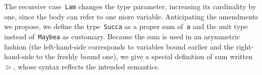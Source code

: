 \documentclass[9pt,preprint,authoryear]{sigplanconf}
\begin{document}
%
The recursive case{~}\textcolor[rgb]{0.70,0.13,0.13}{\texttt{Lam}} changes the type parameter, increasing
    its cardinality by one, since the body can refer to one more
    variable. Anticipating the amendments we propose, we define the
    type{~}\textcolor[rgb]{0,0,0.80}{\texttt{Succ}}\textcolor[rgb]{0,0,0.80}{\texttt{\mbox{\hspace{0.50em}}}}\textcolor[rgb]{0,0,0.80}{\texttt{a}} as a proper sum of{~}\textcolor[rgb]{0,0,0.80}{\texttt{a}} and the unit type{~}\textcolor[cmyk]{0,0.65,0.99,0}{\texttt{\makebox[1.22ex][l]{$ {(} $}}}\textcolor[cmyk]{0,0.65,0.99,0}{\texttt{\makebox[1.22ex][r]{$ {)} $}}}    instead of{~}\textcolor[rgb]{0,0,0.80}{\texttt{Maybe}}\textcolor[rgb]{0,0,0.80}{\texttt{\mbox{\hspace{0.50em}}}}\textcolor[rgb]{0,0,0.80}{\texttt{a}} as customary. Because the sum is used in an
    asymmetric fashion (the left-hand-side corresponds to variables
    bound earlier and the right-hand-side to the freshly bound one),
    we give a special definition of sum written{~}\textcolor[rgb]{0,0,0.80}{\texttt{$ \vartriangleright $}}, whose syntax
    reflects the intended semantics.%


{\nopagebreak }
\end{document}
